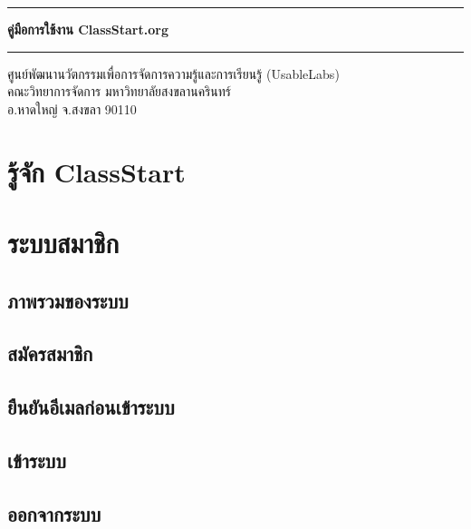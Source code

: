 \documentclass[12pt,oneside]{book}
\begin{document}
\begin{titlepage}

\begin{center}

\hrule

\vspace{1in}

\LARGE
\textbf{คู่มือการใช้งาน ClassStart.org}

\vspace{1in}

\hrule

\vfill

\large
ศูนย์พัฒนานวัตกรรมเพื่อการจัดการความรู้และการเรียนรู้ (UsableLabs)\\
คณะวิทยาการจัดการ มหาวิทยาลัยสงขลานครินทร์\\
อ.หาดใหญ่ จ.สงขลา 90110


\end{center}

\end{titlepage}

\tableofcontents
\clearpage
\setcounter{page}{1}

\chapter{รู้จัก ClassStart}

\chapter{ระบบสมาชิก}

\section{ภาพรวมของระบบ}

\section{สมัครสมาชิก}

\section{ยืนยันอีเมลก่อนเข้าระบบ}

\section{เข้าระบบ}

\section{ออกจากระบบ}
\end{document}
